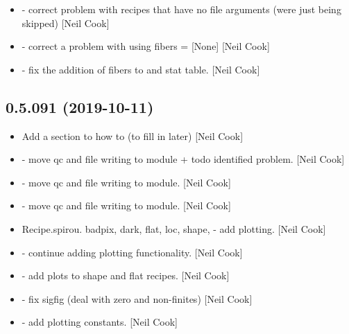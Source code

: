 \documentclass[a4paper,10pt,english]{report}
\begin{document}
\begin{itemize}
\item {} 
 - correct problem with recipes that have no
file arguments (were just being skipped) {[}Neil Cook{]}

\item {} 
 - correct a problem with using fibers = {[}None{]}
{[}Neil Cook{]}

\item {} 
 - fix the addition of fibers to  and stat
table. {[}Neil Cook{]}

\end{itemize}


\subsection{0.5.091 (2019-10-11)}
\label{\detokenize{misc/changelog:id51}}\begin{itemize}
\item {} 
Add a section to how to (to fill in later) {[}Neil Cook{]}

\item {} 
 - move qc and file writing to module + todo
identified problem. {[}Neil Cook{]}

\item {} 
 - move qc and file writing to module.
{[}Neil Cook{]}

\item {} 
 - move qc and file writing to module.
{[}Neil Cook{]}

\item {} 
Recipe.spirou. badpix, dark, flat, loc, shape,  - add
plotting. {[}Neil Cook{]}

\item {} 
 - continue adding plotting functionality. {[}Neil Cook{]}

\item {} 
 - add plots to shape and
flat recipes. {[}Neil Cook{]}

\item {} 
 - fix sigfig (deal with zero and non-finites)
{[}Neil Cook{]}

\item {} 
 - add plotting constants.
{[}Neil Cook{]}

\end{itemize}
\end{document}
